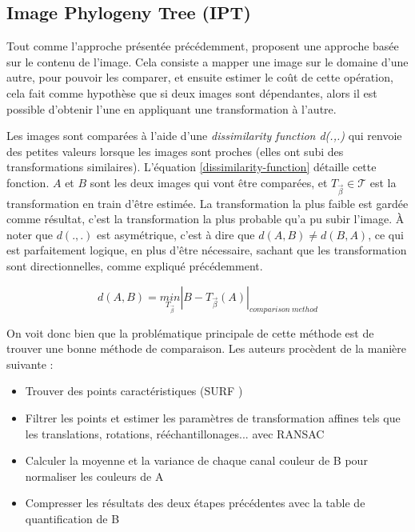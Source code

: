 \documentclass[utf8]{stageM2R} %
\begin{document}
\subsection{Image Phylogeny Tree (IPT)}

Tout comme l'approche présentée précédemment, \citeauthor{dias2010first} \cite{dias2010first}\cite{dias2012image} proposent une approche basée sur le contenu de l'image. Cela consiste a mapper une image sur le domaine d'une autre, pour pouvoir les comparer, et ensuite estimer le coût de cette opération, cela fait comme hypothèse que si deux images sont dépendantes, alors il est possible d'obtenir l'une en appliquant une transformation à l'autre. 

Les images sont comparées à l'aide d'une \textit{dissimilarity function d(.,.)} qui renvoie des petites valeurs lorsque les images sont proches (elles ont subi des transformations similaires). L'équation \ref{dissimilarity-function} détaille cette fonction. $A$ et $B$ sont les deux images qui vont être comparées, et $T_{\overrightarrow{\beta}} \in \mathcal{T}$ est la transformation en train d'être estimée. La transformation la plus faible est gardée comme résultat, c'est la transformation la plus probable qu'a pu subir l'image. À noter que $d(.,.)$ est asymétrique, c'est à dire que $d(A,B) \neq d(B,A)$, ce qui est parfaitement logique, en plus d'être nécessaire, sachant que les transformation sont directionnelles, comme expliqué précédemment.

\begin{equation}
  d(A,B) = \underset{T_{\overrightarrow{\beta}}}{min}\left | B - T_{\overrightarrow{\beta}}(A) \right |_{comparison\ method}
  \label{dissimilarity-function}
\end{equation}

On voit donc bien que la problématique principale de cette méthode est de trouver une bonne méthode de comparaison. Les auteurs procèdent de la manière suivante : 
\begin{itemize}
  \item Trouver des points caractéristiques (SURF \cite{bay2008speeded})
  \item Filtrer les points et estimer les paramètres de transformation affines tels que les translations, rotations, rééchantillonages... avec RANSAC \cite{ransac}
  \item Calculer la moyenne et la variance de chaque canal couleur de B pour normaliser les couleurs de A
  \item Compresser les résultats des deux étapes précédentes avec la table de quantification de B
\end{itemize}
\end{document}
